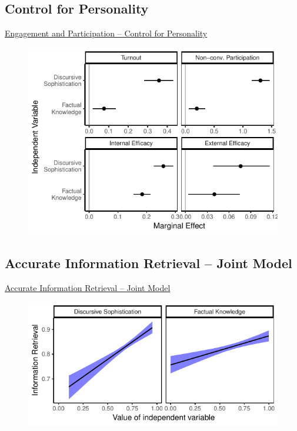 \subsection{Control for Personality}
\begin{frame}{\hyperlink{engagement}{Engagement and Participation -- Control for Personality}}\label{engagement_personality}
  \begin{figure}
  \includegraphics{fig/knoweff_personality.pdf}
  \end{figure}
\end{frame}

\subsection{Accurate Information Retrieval -- Joint Model}
\begin{frame}{\hyperlink{retrieval}{Accurate Information Retrieval -- Joint Model}}\label{retrieval_joint}
  \begin{figure}
  \includegraphics{fig/yg_disease_joint.pdf}
  \end{figure}
\end{frame}



